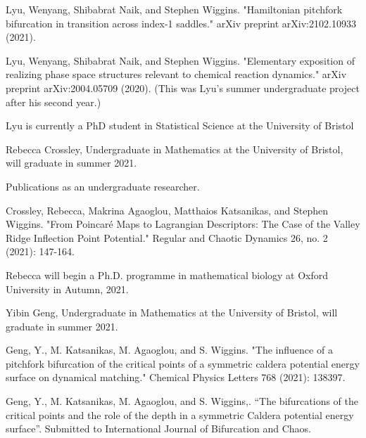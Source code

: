 \documentclass[11pt]{article}
\begin{document}
 

Lyu, Wenyang, Shibabrat Naik, and Stephen Wiggins. "Hamiltonian pitchfork bifurcation in transition across index-1 saddles." arXiv preprint arXiv:2102.10933 (2021).

 

Lyu, Wenyang, Shibabrat Naik, and Stephen Wiggins. "Elementary exposition of realizing phase space structures relevant to chemical reaction dynamics." arXiv preprint arXiv:2004.05709 (2020). (This was Lyu’s summer undergraduate project after his second year.)

 

 

Lyu is currently a PhD student in Statistical Science at the University of Bristol

 

 

Rebecca Crossley, Undergraduate in Mathematics at the University of Bristol, will graduate in summer 2021.

 

 

Publications as an undergraduate researcher.

 

Crossley, Rebecca, Makrina Agaoglou, Matthaios Katsanikas, and Stephen Wiggins. "From Poincaré Maps to Lagrangian Descriptors: The Case of the Valley Ridge Inflection Point Potential." Regular and Chaotic Dynamics 26, no. 2 (2021): 147-164.

 

 

Rebecca will begin a Ph.D. programme in mathematical biology at Oxford University in Autumn, 2021.

 

Yibin Geng, Undergraduate in Mathematics at the University of Bristol, will graduate in summer 2021.

 

 

Geng, Y., M. Katsanikas, M. Agaoglou, and S. Wiggins. "The influence of a pitchfork bifurcation of the critical points of a symmetric caldera potential energy surface on dynamical matching." Chemical Physics Letters 768 (2021): 138397.

 

Geng, Y., M. Katsanikas, M. Agaoglou, and S. Wiggins,. “The bifurcations of the critical points and the role of the depth in a symmetric Caldera potential energy surface”. Submitted to International Journal of Bifurcation and Chaos.
\end{document}
